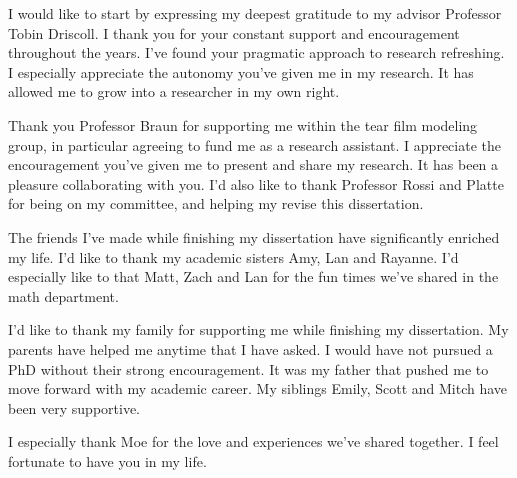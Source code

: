 I would like to start by expressing my deepest gratitude to my advisor Professor Tobin Driscoll. I thank you for your constant support and encouragement throughout the years. I've found your pragmatic approach to research refreshing. I especially appreciate the autonomy you've given me in my research. It has allowed me to grow into a researcher in my own right.

Thank you Professor Braun for supporting me within the tear film modeling group, in particular agreeing to fund me as a research assistant. I appreciate the encouragement you've given me to present and share my research. It has been a pleasure collaborating with you. I'd also like to thank Professor Rossi and Platte for being on my committee, and helping my revise this dissertation.

The friends I've made while finishing my dissertation have significantly enriched my life. I'd like to thank my academic sisters Amy, Lan and Rayanne. I'd especially like to that Matt, Zach and Lan for the fun times we've shared in the math department.

I'd like to thank my family for supporting me while finishing my dissertation. My parents have helped me anytime that I have asked. I would have not pursued a PhD without their strong encouragement. It was my father that pushed me to move forward with my academic career. My siblings Emily, Scott and Mitch have been very supportive.

I especially thank Moe for the love and experiences we've shared together. I feel fortunate to have you in my life.